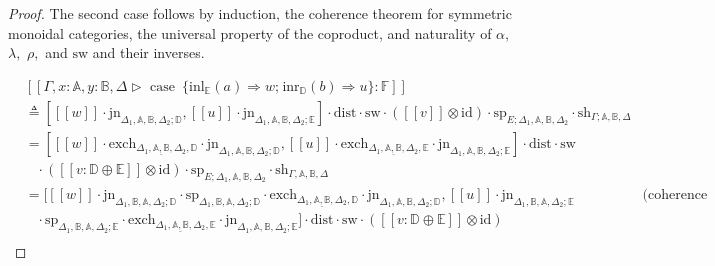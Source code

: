 \documentclass[10pt,a4paper]{amsart}
\theoremstyle{definition}
\theoremstyle{definition}
\theoremstyle{definition}
\theoremstyle{definition}
\theoremstyle{definition}
\theoremstyle{definition}
\begin{document}
\begin{proof}
The second case follows by induction, the coherence theorem for symmetric monoidal categories, the universal property of the coproduct, and naturality of $\alpha,$ $\lambda,$ $\rho,$ and $\text{sw}$ and their inverses.

\begin{align*}
  & [\![\Gamma,x:\mathbb{A}, y:\mathbb{B}, \Delta \triangleright \text{ case }  \hspace{2pt}  \{\text{inl}_{\mathbb{E}} (a) \Rightarrow w ; \hspace{1pt} \text{inr}_{\mathbb{D}} (b) \Rightarrow u\}: \mathbb{F}]\!] \\
  & \triangleq    \left[[\![ w ]\!] \cdot  \text{jn}_{\Delta_{1},\mathbb{A},\mathbb{B},  \Delta_{2};\mathbb{D}},[\![ u ]\!] \cdot  \text{jn}_{\Delta_{1},\mathbb{A},\mathbb{B},  \Delta_{2};\mathbb{E}}\right]   \cdot \text{dist} \cdot \text{sw} \cdot ([\![v]\!] \otimes \text{id}) \cdot \text{sp}_{E; \Delta_{1},\mathbb{A},\mathbb{B},  \Delta_{2}} \cdot \text{sh}_{\Gamma;\mathbb{A}, \mathbb{B},\Delta}  \\
  & = [[\![ w ]\!]  \cdot \text{exch}_{\Delta_{1},\underline{\mathbb{A},\mathbb{B}},  \Delta_{2},\mathbb{D}} \cdot \text{jn}_{\Delta_{1},\mathbb{A},\mathbb{B},  \Delta_{2};\mathbb{D}},    [\![u ]\!] \cdot \text{exch}_{\Delta_{1},\underline{\mathbb{A},\mathbb{B}},  \Delta_{2},\mathbb{E}} \cdot \text{jn}_{\Delta_{1},\mathbb{A},\mathbb{B},  \Delta_{2};\mathbb{E}} ] \cdot \text{dist} \cdot \text{sw} \\
  & \hspace{10pt} \cdot ([\![  v : \mathbb{D} \oplus \mathbb{E}  ]\!] \otimes \text{id}) \cdot\text{sp}_{E; \Delta_{1},\mathbb{A},\mathbb{B},  \Delta_{2}} \cdot \text{sh}_{\Gamma,\mathbb{A}, \mathbb{B},\Delta} \\
  & = [[\![ w ]\!] \cdot \text{jn}_{\Delta_{1} ,\mathbb{B},\mathbb{A},  \Delta_{2};\mathbb{D}} \cdot \text{sp}_{\Delta_{1}, \mathbb{B}, \mathbb{A}, \Delta_{2};\mathbb{D}} \cdot  \text{exch}_{\Delta_{1},\underline{\mathbb{A},\mathbb{B}},  \Delta_{2},\mathbb{D}} \cdot  \text{jn}_{\Delta_{1},\mathbb{A},\mathbb{B},  \Delta_{2};\mathbb{D}}  ,    [\![u ]\!] \cdot \text{jn}_{\Delta_{1} ,\mathbb{B},\mathbb{A},  \Delta_{2};\mathbb{E}} & {\text{(coherence theorem)}} \\
  & \hspace{10pt} \cdot \text{sp}_{\Delta_{1}, \mathbb{B}, \mathbb{A}, \Delta_{2};\mathbb{E}} \cdot  \text{exch}_{\Delta_{1},\underline{\mathbb{A},\mathbb{B}},  \Delta_{2},\mathbb{E}} \cdot  \text{jn}_{\Delta_{1},\mathbb{A},\mathbb{B},  \Delta_{2};\mathbb{E}} ] \cdot \text{dist} \cdot \text{sw} \cdot ([\![  v : \mathbb{D} \oplus \mathbb{E}  ]\!] \otimes \text{id}) \\

\end{align*}
\end{proof}
\end{document}
